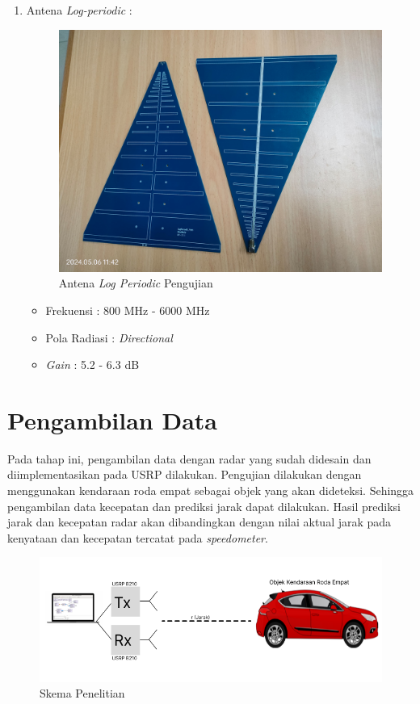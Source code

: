 \begin{enumerate}
	\item Antena \textit{Log-periodic} :
	\begin{figure}
		\begin{center}
			\includegraphics[scale=0.05]{pics/bab3/logPeriodic.jpg}
			\caption{Antena \textit{Log Periodic} Pengujian}
			\label{img:usrpBoard}
		\end{center}
	\end{figure}
	\begin{itemize}
		\item Frekuensi : 800 MHz - 6000 MHz 
		\item Pola Radiasi : \textit{Directional}
		\item \textit{Gain} : 5.2 - 6.3 dB
	\end{itemize}
\end{enumerate}

	
\section{Pengambilan Data}
Pada tahap ini, pengambilan data dengan radar yang sudah didesain dan diimplementasikan pada USRP dilakukan. Pengujian dilakukan dengan menggunakan kendaraan roda empat sebagai objek yang akan dideteksi. Sehingga pengambilan data kecepatan dan prediksi jarak dapat dilakukan. Hasil prediksi jarak dan kecepatan radar akan dibandingkan dengan nilai aktual jarak pada kenyataan dan kecepatan tercatat pada \textit{speedometer}.

\begin{figure}
	\begin{center}
		\includegraphics[scale=0.55]{pics/bab3/skema.png}
		\caption{Skema Penelitian}
		\label{img:skema}
	\end{center}
\end{figure}

